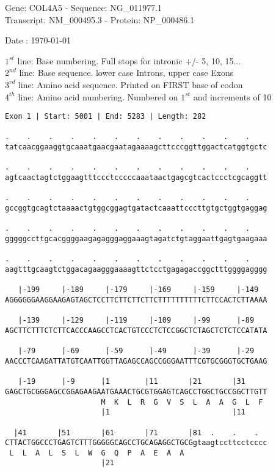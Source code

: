\documentclass{article}
\begin{document}
\begin{center}
\begin{large}
Gene: COL4A5 - Sequence: NG\_011977.1\\
Transcript: NM\_000495.3 - Protein: NP\_000486.1
 
 Date : \today
\end{large}
\end{center}
$1^{st}$ line: Base numbering. Full stops for intronic +/- 5, 10, 15...\\
$2^{nd}$ line: Base sequence. lower case Introns, upper case Exons\\
$3^{rd}$ line: Amino acid sequence. Printed on FIRST base of codon\\
$4^{th}$ line: Amino acid numbering. Numbered on $1^{st}$ and increments of 10\\
\begin{Verbatim}[fontfamily=courier]
Exon 1 | Start: 5001 | End: 5283 | Length: 282

.    .    .    .    .    .    .    .    .    .    .    .    
tatcaacggaaggtgcaaatgaacgaatagaaaagcttcccggttggactcatggtgctc

.    .    .    .    .    .    .    .    .    .    .    .    
agtcaactagtctggaagtttccctcccccaaataactgagcgtcactccctcgcaggtt

.    .    .    .    .    .    .    .    .    .    .    .    
gccggtgcagtctaaaactgtggcggagtgatactcaaattcccttgtgctggtgaggag

.    .    .    .    .    .    .    .    .    .    .    .    
gggggccttgcacggggaagagagggaggaaagtagatctgtaggaattgagtgaagaaa

.    .    .    .    .    .    .    .    .    .    .    .    
aagtttgcaagtctggacagaagggaaaagttctcctgagagaccggctttggggagggg

   |-199     |-189     |-179     |-169     |-159     |-149  
AGGGGGGAAGGAAGAGTAGCTCCTTCTTCTTCTTCTTTTTTTTTTCTTCCACTCTTAAAA

   |-139     |-129     |-119     |-109     |-99      |-89   
AGCTTCTTTCTCTTCACCCAAGCCTCACTGTCCCTCTCCGGCTCTAGCTCTCTCCATATA

   |-79      |-69      |-59      |-49      |-39      |-29   
AACCCTCAAGATTATGTCAATTGGTTAGAGCCAGCCGGGAATTTCGTGCGGGTGCTGAAG

   |-19      |-9      |1        |11       |21       |31     
GAGCTGCGGGAGCCGGAGAAGAATGAAACTGCGTGGAGTCAGCCTGGCTGCCGGCTTGTT
                      M  K  L  R  G  V  S  L  A  A  G  L  F 
                      |1                            |11     

  |41       |51       |61       |71       |81  .    .    .  
CTTACTGGCCCTGAGTCTTTGGGGGCAGCCTGCAGAGGCTGCGgtaagtccttcctcccc
 L  L  A  L  S  L  W  G  Q  P  A  E  A  A                   
                      |21                                   

\end{Verbatim}
\end{document}
